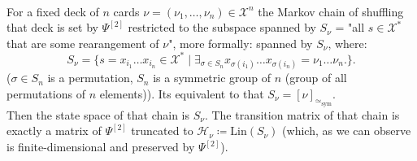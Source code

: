 \documentclass[a4paper]{article}
\newcommand{\SimeqSym}{{\simeq_\mathrm{sym}}}
\begin{document}
\\
For a fixed deck of $n$ cards $\nu = (\nu_1, \dots, \nu_n) \in \mathcal{X}^n$ the Markov chain of shuffling
that deck is set by $\Psi^{[2]}$ restricted to the subspace spanned by $S_\nu$ = "all $s \in \mathcal{X}^*$
that are some rearangement of $\nu$", more formally: spanned by $S_\nu$, where:
\begin{equation*}
S_\nu = \{ s = x_{i_1}\dots x_{i_n} \in \mathcal{X}^* \mid
\exists_{\sigma \in S_n} x_{\sigma(i_1)}\dots x_{\sigma(i_n)} = \nu_1\dots \nu_n. \}.
\end{equation*}
($\sigma \in S_n$ is a permutation, $S_n$ is a symmetric group of $n$ (group of
all permutations of $n$ elements)). Its equivalent to that $S_\nu = [\nu]_\SimeqSym$.\\
Then the state space of that chain is $S_\nu$. The transition matrix of that chain is exactly a matrix of
$\Psi^{[2]}$ truncated to $\mathcal{H}_\nu \coloneqq \mathrm{Lin}(S_\nu)$
(which, as we can observe is finite-dimensional and preserved by $\Psi^{[2]}$). \\[8pt]
\end{document}
